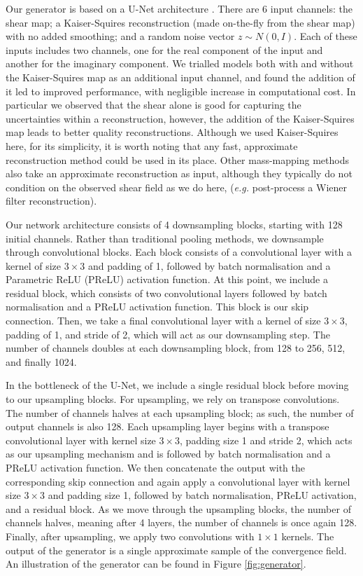 \documentclass[fleqn,usenatbib]{mnras}
\begin{document}
Our generator is based on a U-Net architecture \citep{ronneberger2015u}. There are 6 input channels: the shear map; a Kaiser-Squires reconstruction (made on-the-fly from the shear map) with no added smoothing; and a random noise vector $z \sim N(0,I)$. Each of these inputs includes two channels, one for the real component of the input and another for the imaginary component. We trialled models both with and without the Kaiser-Squires map as an additional input channel, and found the addition of it led to improved performance, with negligible increase in computational cost. In particular we observed that the shear alone is good for capturing the uncertainties within a reconstruction, however, the addition of the Kaiser-Squires map leads to better quality reconstructions. Although we used Kaiser-Squires here, for its simplicity, it is worth noting that any fast, approximate reconstruction method could be used in its place. Other mass-mapping methods \citep{jeffrey2020deep, shirasaki2021noise} also take an approximate reconstruction as input, although they typically do not condition on the observed shear field as we do here, (\textit{e.g.} \citealt{jeffrey2020deep} post-process a Wiener filter reconstruction).

Our network architecture consists of 4 downsampling blocks, starting with 128 initial channels. Rather than traditional pooling methods, we downsample through convolutional blocks. Each block consists of a convolutional layer with a kernel of size $3\times3$ and padding of 1, followed by batch normalisation and a Parametric ReLU (PReLU) activation function. At this point, we include a residual block, which consists of two convolutional layers followed by batch normalisation and a PReLU activation function. This block is our skip connection. Then, we take a final convolutional layer with a kernel of size $3\times3$, padding of 1, and stride of 2, which will act as our downsampling step. The number of channels doubles at each downsampling block, from 128 to 256, 512, and finally 1024. 

In the bottleneck of the U-Net, we include a single residual block before moving to our upsampling blocks. For upsampling, we rely on transpose convolutions. The number of channels halves at each upsampling block; as such, the number of output channels is also 128. Each upsampling layer begins with a transpose convolutional layer with kernel size $3\times3$, padding size 1 and stride 2, which acts as our upsampling mechanism and is followed by batch normalisation and a PReLU activation function. We then concatenate the output with the corresponding skip connection and again apply a convolutional layer with kernel size $3\times3$ and padding size 1, followed by batch normalisation, PReLU activation, and a residual block. As we move through the upsampling blocks, the number of channels halves, meaning after 4 layers, the number of channels is once again 128. Finally, after upsampling, we apply two convolutions with $1\times1$ kernels. The output of the generator is a single approximate sample of the convergence field. An illustration of the generator can be found in Figure \ref{fig:generator}.
\end{document}
